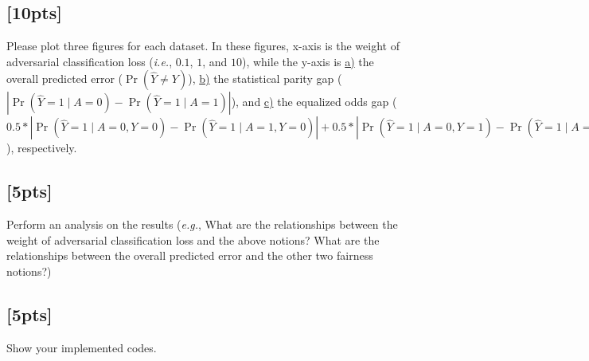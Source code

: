 \documentclass[letterpaper,11pt]{article}
\theoremstyle{definition}
\begin{document}
	\subsection{[10pts]}
	Please plot three figures for each dataset. In these figures, x-axis is the weight of adversarial classification loss (\textit{i.e.}, $0.1$, $1$, and $10$), while the y-axis is \underline{a)} the overall predicted error ($\Pr(\hat{Y}\neq Y)$), \underline{b)} the statistical parity gap ($| \Pr(\hat{Y}=1\mid A=0) - \Pr(\hat{Y}=1\mid A=1)|$), and \underline{c)} the equalized odds gap ($0.5*| \Pr(\hat{Y}=1\mid A=0, Y=0) - \Pr(\hat{Y}=1\mid A=1, Y=0)| + 0.5*| \Pr(\hat{Y}=1\mid A=0, Y=1) - \Pr(\hat{Y}=1\mid A=1, Y=1)| $), respectively.
	
	\subsection{[5pts]}
	Perform an analysis on the results (\textit{e.g.}, What are the relationships between the weight of adversarial classification loss and the above notions? What are the relationships between the overall predicted error and the other two fairness notions?)
	
	\subsection{[5pts]}
	Show your implemented codes.
	
\end{document}

